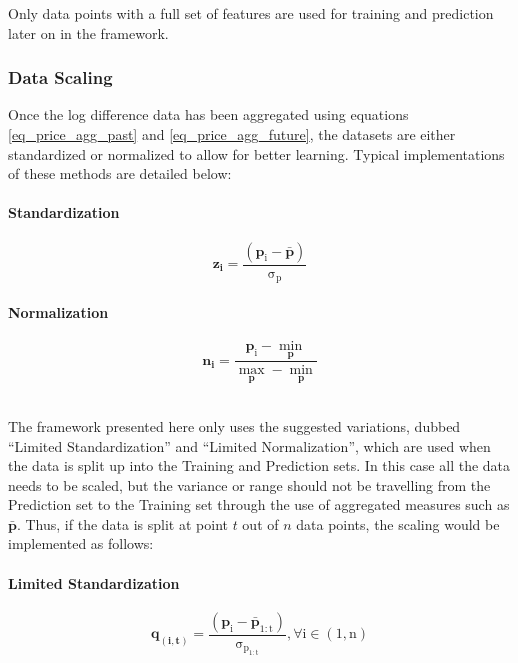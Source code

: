 \documentclass[a4paper,11pt,oneside]{article}
\theoremstyle{plain}
\theoremstyle{definition}
\begin{document}
	Only data points with a full set of features are used for training and prediction later on in the framework.
	
	\subsubsection{Data Scaling}\label{data_scaling}
	Once the log difference data has been aggregated using equations \ref{eq_price_agg_past} and \ref{eq_price_agg_future}, the datasets are either standardized or normalized to allow for better learning. Typical implementations of these methods are detailed below:
	
	\paragraph{Standardization}
	\begin{equation}
	\mathbf{z_i}= \mathrm{\frac{(\mathbf{p}_i - \mathbf{\bar{p}}) }{\sigma_p}}
	\end{equation}
	
	\paragraph{Normalization}
	
	\begin{equation}\label{eq_ltd_normalization}
	\mathbf{n_i}= 
	\frac{\mathrm{\mathbf{p}_i - \min\limits_{\mathbf{p}}}}
	{\mathrm{\max\limits_{\mathbf{p}} -\min\limits_{\mathbf{p}}}}
	\end{equation}
	
	~\\
	The framework presented here only uses the suggested variations, dubbed ``Limited Standardization'' and ``Limited Normalization'', which are used when the data is split up into the Training and Prediction sets. In this case all the data needs to be scaled, but the variance or range should not be travelling from the Prediction set to the Training set through the use of aggregated measures such as $\bar{\mathbf{p}}$. Thus, if the data is split at point $t$ out of $n$ data points, the scaling would be implemented as follows:
	
	\paragraph{Limited Standardization}
	
	\begin{equation}
	\mathbf{q_{(i, t)}} =\mathrm{ \frac{(\mathbf{p}_i - \bar{\mathbf{p}}_{1:t}) }{\sigma_{p_{1:t}}} , \forall  i \in (1, n)}
	\end{equation}
	
\end{document}
